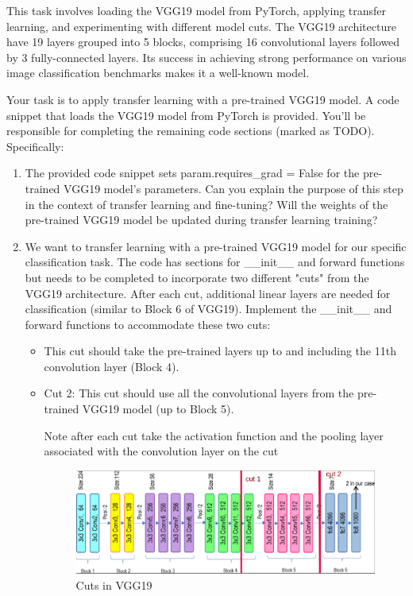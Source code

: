 \documentclass[11pt]{scrartcl}
\begin{document}
This task involves loading the VGG19 model from PyTorch, 
applying transfer learning, and experimenting with different model cuts. 
The VGG19 architecture have 19 layers grouped into 5 blocks, 
comprising 16 convolutional layers followed by 3 fully-connected layers. 
Its success in achieving strong performance on various image classification benchmarks 
makes it a well-known model.

Your task is to apply transfer learning with a pre-trained VGG19 model. 
A code snippet that loads the VGG19 model from PyTorch is provided. 
You'll be responsible for completing the remaining code sections (marked as TODO). 
Specifically:

\begin{enumerate}
    \item The provided code snippet sets param.requires\_grad = False 
	for the pre-trained VGG19 model's parameters. 
	Can you explain the purpose of this step in the context of transfer learning and fine-tuning? 
	Will the weights of the pre-trained VGG19 model be updated during transfer learning training?

    \item We want to transfer learning with a pre-trained VGG19 model 
	for our specific classification task. The code has sections for \_\_init\_\_ 
	and forward functions but needs to be completed to incorporate two different "cuts" 
	from the VGG19 architecture. 
	After each cut, additional linear layers are needed for classification 
	(similar to Block 6 of VGG19).
	Implement the \_\_init\_\_ and forward functions to accommodate these two cuts:

	\begin{itemize}
		\item This cut should take the pre-trained layers up to 
		and including the 11th convolution layer (Block 4).

		\item Cut 2: This cut should use all the convolutional layers 
		from the pre-trained VGG19 model (up to Block 5).
		
		Note after each cut take the activation function and the pooling layer 
		associated with the convolution layer on the cut

		\begin{figure}[th]
			\centering
			\includegraphics[scale=0.33]{cuts.png}
			\caption{Cuts in VGG19}
			\label{fig:model-vgg19}
		\end{figure}
	\end{itemize}


\end{enumerate}
\end{document}
